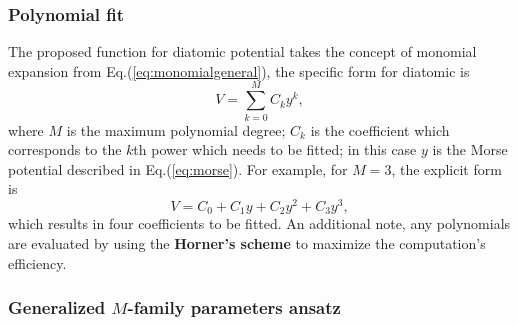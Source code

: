 \documentclass[12pt]{article}
\begin{document}
\subsubsection{Polynomial fit}
The proposed function for diatomic potential takes the concept of monomial expansion from Eq.(\ref{eq:monomialgeneral}), the specific form for diatomic is
\begin{equation}
    V = \sum^M_{k=0}C_ky^k,
    \label{eq:proposeddiatomic}
\end{equation}
where $M$ is the maximum polynomial degree; $C_k$ is the coefficient which corresponds to the $k$th power which needs to be fitted; in this case $y$ is the Morse potential described in Eq.(\ref{eq:morse}). For example, for $M=3$, the explicit form is
\begin{equation}
    V = C_0 + C_1y + C_2y^2 + C_3y^3,
\end{equation}
which results in four coefficients to be fitted. An additional note, any polynomials are evaluated by using the \textbf{Horner's scheme} \cite{horner} to maximize the computation's efficiency.

\subsubsection{Generalized $M$-family parameters ansatz}
\end{document}
